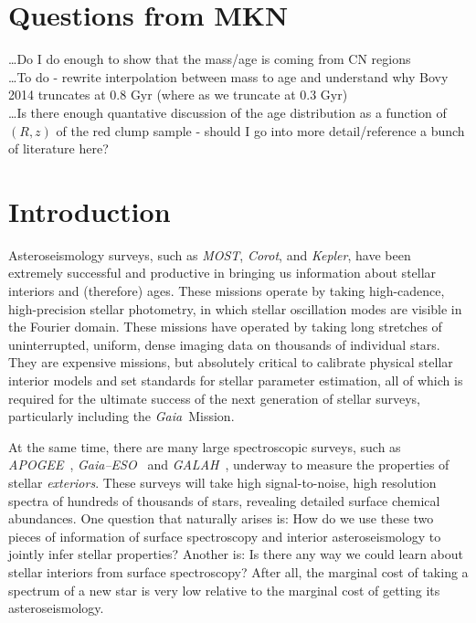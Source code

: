 \documentclass[12pt, preprint]{aastex}
\newcommand{\project}[1]{\textsl{#1}}
\newcommand{\apogee}{\project{APOGEE}}
\newcommand{\corot}{\project{Corot}}
\newcommand{\kepler}{\project{Kepler}}
\newcommand{\gaia}{\project{Gaia}}
\newcommand{\gaiaeso}{\project{Gaia--ESO}}
\newcommand{\galah}{\project{GALAH}}
\newcommand{\most}{\project{MOST}}
\begin{document}

\section{Questions from MKN}

\ldots Do I do enough to show that the mass/age is coming from CN regions \\
\ldots To do - rewrite interpolation between mass to age and understand why Bovy 2014 truncates at 0.8 Gyr (where as we truncate at 0.3 Gyr) \\
\ldots Is there enough quantative discussion of the age distribution as a function of $(R,z)$ of the red clump sample - should I go into more detail/reference a bunch of literature here? \\


\section{Introduction}\label{sec:Intro}

Asteroseismology surveys, such as \most, \corot, and \kepler, have
been extremely successful and productive in bringing us information
about stellar interiors and (therefore) ages.
These missions operate by taking high-cadence, high-precision stellar
photometry, in which stellar oscillation modes are visible in the
Fourier domain.
These missions have operated by taking long stretches of
uninterrupted, uniform, dense imaging data on thousands of individual
stars.
They are expensive missions, but absolutely critical to calibrate
physical stellar interior models and set standards for stellar
parameter estimation, all of which is required for the ultimate
success of the next generation of stellar surveys, particularly
including the \gaia\ Mission.

At the same time, there are many large spectroscopic surveys, such
as \apogee\ \citep{Majewski2012}, \gaiaeso\ \citep{Gilmore2012} and \galah\ \citep{Freeman2012}, underway to measure the properties
of stellar \emph{exteriors}.
These surveys will take high signal-to-noise, high resolution spectra
of hundreds of thousands of stars, revealing detailed surface chemical
abundances.
One question that naturally arises is:
How do we use these two pieces of information of surface spectroscopy
and interior asteroseismology to jointly infer stellar properties?
Another is:
Is there any way we could learn about stellar interiors from surface
spectroscopy?
After all, the marginal cost of taking a spectrum of
a new star is very low relative to the marginal cost of getting its
asteroseismology.
\end{document}
